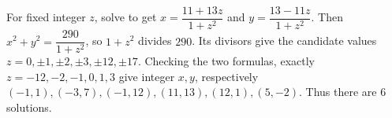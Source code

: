 For fixed integer $z$, solve to get $x=\dfrac{11+13z}{1+z^2}$ and $y=\dfrac{13-11z}{1+z^2}$. Then $x^2+y^2=\dfrac{290}{1+z^2}$, so $1+z^2$ divides $290$. Its divisors give the candidate values $z=0,\pm1,\pm2,\pm3,\pm12,\pm17$. Checking the two formulas, exactly $z=-12,-2,-1,0,1,3$ give integer $x,y$, respectively $(-1,1),(-3,7),(-1,12),(11,13),(12,1),(5,-2)$. Thus there are $\boxed6$ solutions.
